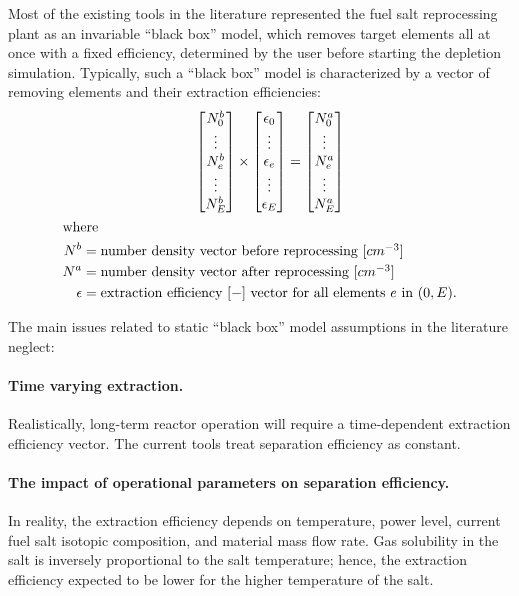 Most of the existing tools in the literature represented the fuel salt 
reprocessing plant as an invariable ``black box'' model, which removes target 
elements all at once with a fixed efficiency, determined by the user before 
starting the depletion simulation. Typically, such a ``black box'' model is 
characterized by a vector of removing elements and their extraction 
efficiencies:
\begin{align}
&\qquad\qquad\qquad\qquad
\begin{bmatrix}
N^{b}_{0} \\ \vdots \\ N^{b}_{e} \\ \vdots \\ N^{b}_{E} \\
\end{bmatrix} 
\times
\begin{bmatrix}
\epsilon_{0} \\ \vdots \\ \epsilon_{e} \\ \vdots \\ \epsilon_{E} \\
\end{bmatrix} =
\begin{bmatrix}
N^{a}_{0}\\ \vdots \\ N^{a}_{e} \\ \vdots \\N^{a}_{E}  \\
\end{bmatrix} \\
\intertext{where}
N^{b} &= \mbox{number density vector before reprocessing $[cm^{-3}]$} 
\nonumber \\
N^{a} &= \mbox{number density vector after reprocessing $[cm^{-3}]$} 
\nonumber \\
\epsilon &= \mbox{extraction efficiency $[-]$ vector for all elements $e$ in 
$(0,E)$.} \nonumber
\end{align}

The main issues related to static ``black box'' model assumptions in the 
literature neglect: 
\paragraph*{Time varying extraction.} Realistically, long-term reactor 
operation will require a time-dependent extraction efficiency vector. The 
current tools treat separation efficiency as constant.
\paragraph*{The impact of operational parameters on separation efficiency.} In 
reality, the extraction efficiency depends on temperature, power level, 
current fuel salt isotopic composition, and material mass flow rate. Gas 
solubility in the salt is inversely proportional to the salt temperature; 
hence, the extraction efficiency expected to be lower for the higher 
temperature of the salt.
